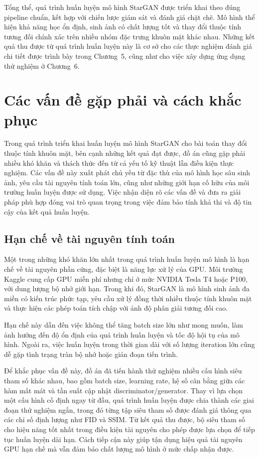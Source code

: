 \documentclass[../DoAn.tex]{subfiles}
\begin{document}
Tổng thể, quá trình huấn luyện mô hình StarGAN được triển khai theo đúng pipeline chuẩn, kết hợp với chiến lược giám sát và đánh giá chặt chẽ. Mô hình thể hiện khả năng học ổn định, sinh ảnh có chất lượng tốt và thay đổi thuộc tính tương đối chính xác trên nhiều nhóm đặc trưng khuôn mặt khác nhau. Những kết quả thu được từ quá trình huấn luyện này là cơ sở cho các thực nghiệm đánh giá chi tiết được trình bày trong Chương~5, cũng như cho việc xây dựng ứng dụng thử nghiệm ở Chương~6.






\section{Các vấn đề gặp phải và cách khắc phục}
\label{section:4.3}

Trong quá trình triển khai huấn luyện mô hình StarGAN cho bài toán thay đổi thuộc tính khuôn mặt, bên cạnh những kết quả đạt được, đồ án cũng gặp phải nhiều khó khăn và thách thức đến từ cả yếu tố kỹ thuật lẫn điều kiện thực nghiệm. Các vấn đề này xuất phát chủ yếu từ đặc thù của mô hình học sâu sinh ảnh, yêu cầu tài nguyên tính toán lớn, cũng như những giới hạn cố hữu của môi trường huấn luyện được sử dụng. Việc nhận diện rõ các vấn đề và đưa ra giải pháp phù hợp đóng vai trò quan trọng trong việc đảm bảo tính khả thi và độ tin cậy của kết quả huấn luyện.

\subsection{Hạn chế về tài nguyên tính toán}

Một trong những khó khăn lớn nhất trong quá trình huấn luyện mô hình là hạn chế về tài nguyên phần cứng, đặc biệt là năng lực xử lý của GPU. Môi trường Kaggle cung cấp GPU miễn phí nhưng chỉ ở mức NVIDIA Tesla T4 hoặc P100, với dung lượng bộ nhớ giới hạn. Trong khi đó, StarGAN là mô hình sinh ảnh đa miền có kiến trúc phức tạp, yêu cầu xử lý đồng thời nhiều thuộc tính khuôn mặt và thực hiện các phép toán tích chập với ảnh độ phân giải tương đối cao.

Hạn chế này dẫn đến việc không thể tăng batch size lớn như mong muốn, làm ảnh hưởng đến độ ổn định của quá trình huấn luyện và tốc độ hội tụ của mô hình. Ngoài ra, việc huấn luyện trong thời gian dài với số lượng iteration lớn cũng dễ gặp tình trạng tràn bộ nhớ hoặc gián đoạn tiến trình.

Để khắc phục vấn đề này, đồ án đã tiến hành thử nghiệm nhiều cấu hình siêu tham số khác nhau, bao gồm batch size, learning rate, hệ số cân bằng giữa các hàm mất mát và tần suất cập nhật discriminator/generator. Thay vì lựa chọn một cấu hình cố định ngay từ đầu, quá trình huấn luyện được chia thành các giai đoạn thử nghiệm ngắn, trong đó từng tập siêu tham số được đánh giá thông qua các chỉ số định lượng như FID và SSIM. Từ kết quả thu được, bộ siêu tham số cho hiệu năng tốt nhất trong điều kiện tài nguyên cho phép được lựa chọn để tiếp tục huấn luyện dài hạn. Cách tiếp cận này giúp tận dụng hiệu quả tài nguyên GPU hạn chế mà vẫn đảm bảo chất lượng mô hình ở mức chấp nhận được.
\end{document}
